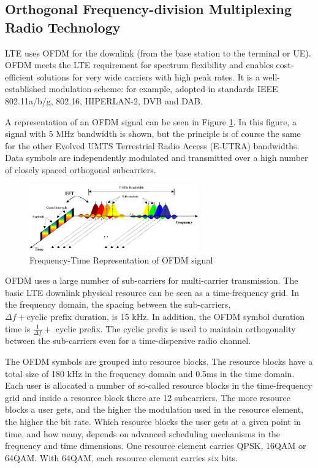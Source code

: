 \subsection{Orthogonal Frequency-division Multiplexing Radio Technology} %

LTE uses OFDM for the downlink (from the base station to the terminal or UE).
OFDM meets the LTE requirement for spectrum flexibility and enables
cost-efficient solutions for very wide carriers with high peak rates. It is a
well-established modulation scheme: for example, adopted in standards IEEE
802.11a/b/g, 802.16, HIPERLAN-2, DVB and DAB.

A representation of an OFDM signal can be seen in Figure \ref{fig:ofdmfreq}. In
this figure, a signal with 5 MHz bandwidth is shown, but the principle is of
course the same for the other Evolved UMTS Terrestrial Radio Access (E-UTRA)
bandwidths. Data symbols are independently modulated and transmitted over a high
number of closely spaced orthogonal subcarriers.

\begin{figure}[htbp]
    \centering
    \includegraphics[width=0.65\textwidth]{./figures/ofdm_frequency}
    \caption{ Frequency-Time Representation of OFDM signal
    \label{fig:ofdmfreq}}
\end{figure}

OFDM uses a large number of sub-carriers for multi-carrier transmission. The
basic LTE downlink physical resource can be seen as a time-frequency grid. In
the frequency domain, the spacing between the sub-carriers, $\Delta f +
\text{cyclic prefix duration}$, is 15 kHz. In addition, the OFDM symbol duration
time is $\frac{1}{\Delta f} +$ cyclic prefix. The cyclic prefix is used to
maintain orthogonality between the sub-carriers even for a time-dispersive radio
channel.

The OFDM symbols are grouped into resource blocks. The resource blocks have a
total size of 180 kHz in the frequency domain and 0.5ms in the time domain. Each
user is allocated a number of so-called resource blocks in the time-frequency
grid and inside a resource block there are 12 subcarriers. The more resource
blocks a user gets, and the higher the modulation used in the resource element,
the higher the bit rate. Which resource blocks the user gets at a given point in
time, and how many, depends on advanced scheduling mechanisms in the frequency
and time dimensions. One resource element carries QPSK, 16QAM or 64QAM. With
64QAM, each resource element carries six bits.

